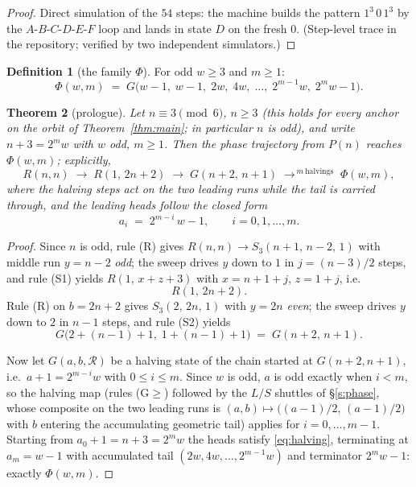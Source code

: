 \documentclass[11pt]{amsart}
\newtheorem{theorem}{Theorem}[section]
\theoremstyle{definition}
\newtheorem{definition}[theorem]{Definition}
\begin{document}
\begin{proof}
Direct simulation of the $54$ steps: the machine builds the pattern
$1^3\,0\,1^3$ by the $A$-$B$-$C$-$D$-$E$-$F$ loop and lands in state $D$ on
the fresh $0$. (Step-level trace in the repository; verified by two
independent simulators.)
\end{proof}

\begin{definition}[the family $\Phi$]\label{def:phi}
For odd $w\ge3$ and $m\ge1$:
\[
\Phi(w,m)\;=\;G\bigl(w-1,\;w-1,\;2w,\;4w,\;\dots,\;2^{m-1}w,\;2^{m}w-1\bigr).
\]
\end{definition}

\begin{theorem}[prologue]\label{thm:prologue}
Let $n\equiv3\pmod6$, $n\ge3$ (this holds for every anchor on the orbit of
Theorem~\ref{thm:main}; in particular $n$ is odd), and write
$n+3=2^{m}w$ with $w$ odd, $m\ge1$. Then the phase
trajectory from $P(n)$ reaches $\Phi(w,m)$; explicitly,
\[
R(n,n)\;\to\;R(1,\,2n+2)\;\to\;G(n+2,\,n+1)\;\to^{\,m\ \text{halvings}}\;\Phi(w,m),
\]
where the halving steps act on the two leading runs while the tail is
carried through, and the leading heads follow the closed form
\begin{equation}\label{eq:halving}
a_i \;=\; 2^{m-i}\,w-1,\qquad i=0,1,\dots,m .
\end{equation}
\end{theorem}

\begin{proof}
Since $n$ is odd, rule (R) gives $R(n,n)\to S_3(n+1,\,n-2,\,1)$ with
middle run $y=n-2$ \emph{odd}; the sweep drives $y$ down to $1$ in
$j=(n-3)/2$ steps, and rule (S1) yields $R(1,\,x+z+3)$ with
$x=n+1+j$, $z=1+j$, i.e.\
\[
R(1,\,2n+2).
\]
Rule (R) on $b=2n+2$ gives $S_3(2,\,2n,\,1)$ with $y=2n$ \emph{even}; the
sweep drives $y$ down to $2$ in $n-1$ steps, and rule (S2) yields
\[
G\bigl(2+(n-1)+1,\;1+(n-1)+1\bigr)\;=\;G(n+2,\,n+1).
\]

Now let $G(a,b,\mathcal R)$ be a halving state of the chain started at
$G(n+2,n+1)$, i.e.\ $a+1=2^{m-i}w$ with $0\le i\le m$. Since $w$ is odd,
$a$ is odd exactly when $i<m$, so the halving map (rules (G$\ge$) followed
by the $L/S$ shuttles of \S\ref{s:phase}, whose composite on the two
leading runs is
$(a,b)\mapsto\bigl((a-1)/2,\,(a-1)/2\bigr)$ with $b$ entering the
accumulating geometric tail) applies for $i=0,\dots,m-1$. Starting from
$a_0+1=n+3=2^{m}w$ the heads satisfy \eqref{eq:halving}, terminating at
$a_m=w-1$ with accumulated tail $(2w,4w,\dots,2^{m-1}w)$ and terminator
$2^{m}w-1$: exactly $\Phi(w,m)$.
\end{proof}
\end{document}
